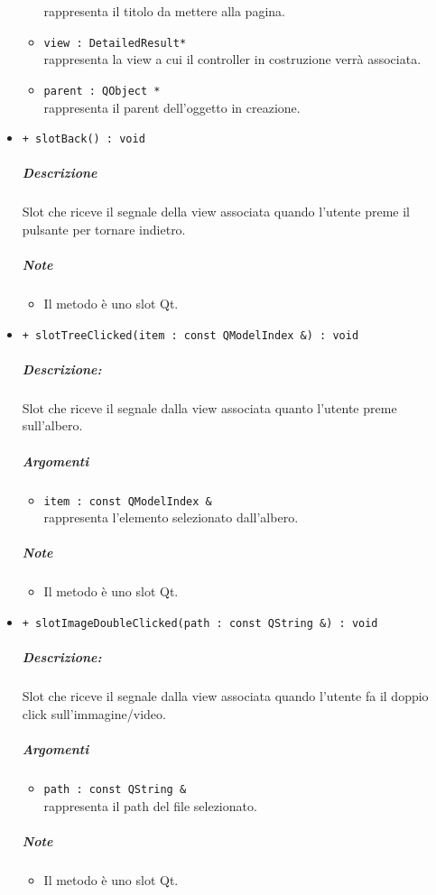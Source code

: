 \begin{itemize}
\begin{itemize}
\color{black} rappresenta il titolo da mettere alla pagina.
				\item \color{RoyalPurple} \verb!view : DetailedResult*!\\				
\color{black} rappresenta la view a cui il controller in costruzione verrà associata.
				\item \color{RoyalPurple} \verb!parent : QObject *!\\				
\color{black} rappresenta il parent dell'oggetto in creazione.
			\end{itemize}
			\item \color{blue} \verb!+ slotBack() : void!
			\color{black}
			\subparagraph{Descrizione} Slot\g{} che riceve il segnale della view associata quando l'utente preme il pulsante per tornare indietro.
			\subparagraph{Note}
			\begin{itemize}
				\item Il metodo è uno slot\g{} Qt\g{}.
			\end{itemize}
			\item \color{blue} \verb!+ slotTreeClicked(item : const QModelIndex &) : void!
			\color{black}
			\subparagraph{Descrizione:} Slot\g{} che riceve il segnale dalla view associata quanto l'utente preme sull'albero.
			\color{black}
			\subparagraph{Argomenti}
			\begin{itemize}
				\item \color{RoyalPurple} \verb!item : const QModelIndex &!\\				
\color{black} rappresenta l'elemento selezionato dall'albero.
			\end{itemize}
			\subparagraph{Note}
			\begin{itemize}
				\item Il metodo è uno slot\g{} Qt\g{}.
			\end{itemize}
			\item \color{blue} \verb!+ slotImageDoubleClicked(path : const QString &) : void!
			\color{black}
			\subparagraph{Descrizione:} Slot\g{} che riceve il segnale dalla view associata quando l'utente fa il doppio click sull'immagine/video.
			\color{black}
			\subparagraph{Argomenti}
			\begin{itemize}
				\item \color{RoyalPurple} \verb!path : const QString &!\\				
\color{black} rappresenta il path del file selezionato.
			\end{itemize}
			\subparagraph{Note}
			\begin{itemize}
				\item Il metodo è uno slot\g{} Qt\g{}.
			\end{itemize}
		\end{itemize}
		\pagebreak
